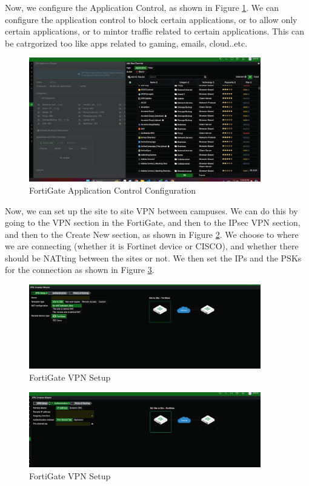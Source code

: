 \documentclass[12pt]{report}
\begin{document}
Now, we configure the Application Control, as shown in Figure \ref{fig:ac}. We can configure the application control to block certain applications, or to allow only certain applications, or to mintor traffic related to certain applications. This can be catrgorized too like apps related to gaming, emails, cloud..etc.
\begin{figure}
    \centering
    \includegraphics[width=0.9\textwidth]{images/Implementation/ac.png}
    \caption{FortiGate Application Control Configuration}
    \label{fig:ac}
\end{figure}
Now, we can set up the site to site VPN between campuses. We can do this by going to the VPN section in the FortiGate, and then to the IPsec VPN section, and then to the Create New section, as shown in Figure \ref{fig:vpnsetup}. We choose to where we are connecting (whether it is Fortinet device or CISCO), and whether there should be NATting between the sites or not. We then set the IPs and the PSKs for the connection as shown in Figure \ref{fig:vpn2}.
\begin{figure}
    \centering
    \includegraphics[width=0.9\textwidth]{images/Implementation/vpnsetup.png}
    \caption{FortiGate VPN Setup}
    \label{fig:vpnsetup}
\end{figure}
\begin{figure}
    \centering
    \includegraphics[width=0.9\textwidth]{images/Implementation/vpn2.png}
    \caption{FortiGate VPN Setup}
    \label{fig:vpn2}
\end{figure}
\end{document}
